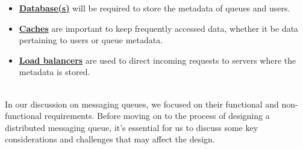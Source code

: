 \begin{itemize}
\item
\protect{}\label{DcSZyWLAM5Eh93xca2ZU9}
\href{https://www.educative.io/courses/grokking-the-system-design-interview/introduction-to-databases}{\textbf{Database(s)}} will be required to store the metadata of queues and users.
\item
\protect{}\label{gXPqu1uY4ukH7pxj3O46I}
\href{https://www.educative.io/courses/grokking-the-system-design-interview/system-design-the-distributed-cache}{\textbf{Caches}} are important to keep frequently accessed data, whether it be data pertaining to users or queue metadata.
\item
\protect{}\label{-Q5fq2blcR7q74LvBgohv}
\href{https://www.educative.io/courses/grokking-the-system-design-interview/introduction-to-load-balancers}{\textbf{Load balancers}} are used to direct incoming requests to servers where the metadata is stored.
\end{itemize}
\\
In our discussion on messaging queues, we focused on their functional and non-functional requirements. Before moving on to the process of designing a distributed messaging queue, it's essential for us to discuss some key considerations and challenges that may affect the design.\\
\strut \\

